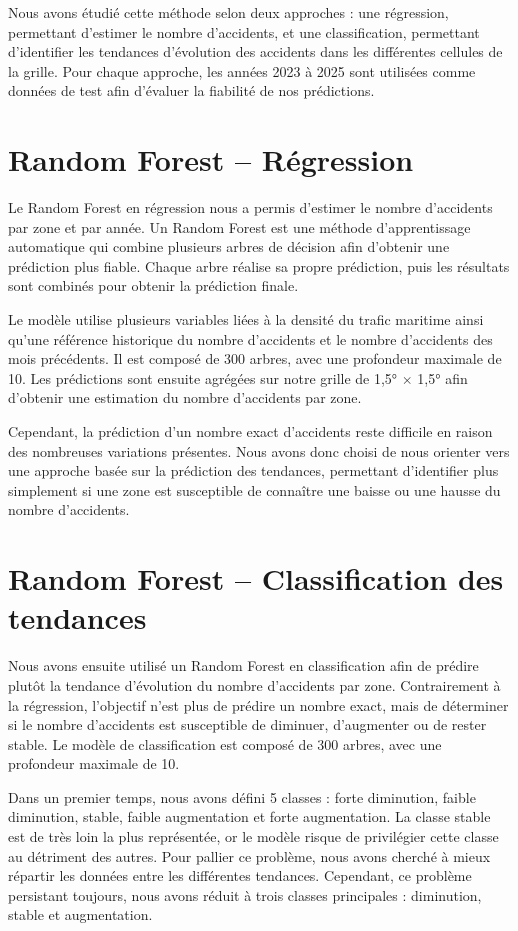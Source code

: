 \documentclass[12pt, a4paper]{report}
\begin{document}
Nous avons étudié cette méthode selon deux approches : une régression, permettant d'estimer le nombre d'accidents, et une classification, permettant d'identifier les tendances d'évolution des accidents dans les différentes cellules de la grille. Pour chaque approche, les années 2023 à 2025 sont utilisées comme données de test afin d'évaluer la fiabilité de nos prédictions.

\section{Random Forest -- Régression}

Le Random Forest en régression nous a permis d'estimer le nombre d'accidents par zone et par année. Un Random Forest est une méthode d'apprentissage automatique qui combine plusieurs arbres de décision afin d'obtenir une prédiction plus fiable. Chaque arbre réalise sa propre prédiction, puis les résultats sont combinés pour obtenir la prédiction finale.

Le modèle utilise plusieurs variables liées à la densité du trafic maritime ainsi qu'une référence historique du nombre d'accidents et le nombre d'accidents des mois précédents. Il est composé de 300 arbres, avec une profondeur maximale de 10. Les prédictions sont ensuite agrégées sur notre grille de 1,5° $\times$ 1,5° afin d'obtenir une estimation du nombre d'accidents par zone.

Cependant, la prédiction d'un nombre exact d'accidents reste difficile en raison des nombreuses variations présentes. Nous avons donc choisi de nous orienter vers une approche basée sur la prédiction des tendances, permettant d'identifier plus simplement si une zone est susceptible de connaître une baisse ou une hausse du nombre d'accidents.

\section{Random Forest -- Classification des tendances}

Nous avons ensuite utilisé un Random Forest en classification afin de prédire plutôt la tendance d'évolution du nombre d'accidents par zone. Contrairement à la régression, l'objectif n'est plus de prédire un nombre exact, mais de déterminer si le nombre d'accidents est susceptible de diminuer, d'augmenter ou de rester stable. Le modèle de classification est composé de 300 arbres, avec une profondeur maximale de 10.

Dans un premier temps, nous avons défini 5 classes : forte diminution, faible diminution, stable, faible augmentation et forte augmentation. La classe \og stable \fg{} est de très loin la plus représentée, or le modèle risque de privilégier cette classe au détriment des autres. Pour pallier ce problème, nous avons cherché à mieux répartir les données entre les différentes tendances. Cependant, ce problème persistant toujours, nous avons réduit à trois classes principales : diminution, stable et augmentation.
\end{document}
